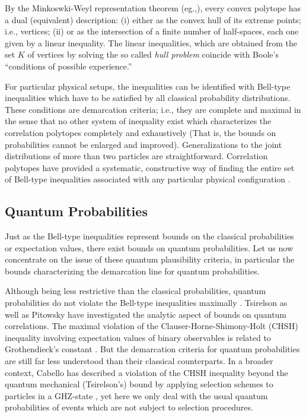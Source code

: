 By the Minkoswki-Weyl representation theorem (eg.,\cite[p.29]{ziegler}),
every convex polytope has a dual (equivalent) description:
(i)
either as the convex hull of its extreme points; i.e., vertices;
(ii)
or as the intersection of a finite number of half-spaces,
each one given by a linear inequality.
The linear inequalities,
which are obtained
from the set $K$ of vertices
by solving the so called {\em hull problem}
coincide with Boole's ``conditions of possible experience.''

For particular physical setups,
the inequalities can be identified with Bell-type inequalities which have to be satisfied by
all classical probability distributions.
These conditions are demarcation criteria; i.e.,
they are complete and maximal in the sense that no other system of inequality exist
which characterizes the correlation polytopes completely and exhaustively
(That is, the bounds on probabilities cannot be enlarged and improved).
Generalizations to the joint distributions of more than two particles are straightforward.
Correlation polytopes have provided a systematic, constructive way of finding
the entire set of Bell-type inequalities associated with any particular physical configuration
\cite{2000-poly,2001-cddif}.

\subsection{Quantum Probabilities}

Just as the Bell-type inequalities represent bounds on the
classical probabilities or expectation values,
there exist bounds on quantum probabilities.
Let us now concentrate on the issue of these
quantum plausibility criteria, in particular the bounds
characterizing the demarcation line for quantum probabilities.

Although being less restrictive than the classical probabilities,
quantum probabilities do not violate the
Bell-type inequalities maximally
\cite{pop-rohr,svozil-krenn}.
Tsirelson \cite{cirelson:80,cirelson,khalfin-97}
as well as Pitowsky \cite{pit:range-2001}
have investigated the analytic aspect of bounds on quantum
correlations.
The maximal violation of the
Clauser-Horne-Shimony-Holt (CHSH) inequality involving expectation values of
binary observables is related to Grothendieck's constant
\cite{fishburn-reeds-1994}. But the demarcation criteria for quantum
probabilities are still far less understood than their classical
counterparts.
In a broader context, Cabello has described a
violation of the CHSH inequality beyond the quantum mechanical (Tsirelson's)
bound by applying selection schemes to particles in a GHZ-state
\cite{cabello-02a,cabello-02b}, yet here we only deal with the usual quantum probabilities of events
which are not subject to selection procedures.


